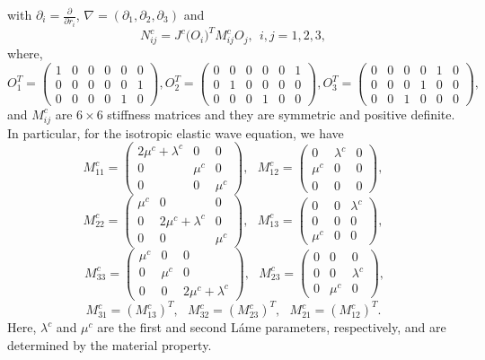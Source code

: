with $\partial_i = \frac{\partial}{\partial r_i}$, $\nabla = (\partial_1,\partial_2,\partial_3)$ and
\begin{equation}\label{N_definition}
	N_{ij}^c = J^c\big(O_i\big)^TM_{ij}^cO_j, \ \ i,j = 1,2,3,
\end{equation}
where, 
\[ O_{1}^T = \left(\begin{array}{cccccc}
1 & 0 & 0 &0 & 0 & 0\\
0 & 0 & 0 &0 & 0 & 1\\
0 & 0 & 0 &0 & 1 & 0\end{array}\right),  O_{2}^T = \left(\begin{array}{cccccc}
0 & 0 & 0 &0 & 0 & 1\\
0 & 1 & 0 &0 & 0 & 0\\
0 & 0 & 0 &1 & 0 & 0\end{array}\right),  O_{3}^T = \left(\begin{array}{cccccc}
0 & 0 & 0 &0 & 1 & 0\\
0 & 0 & 0 &1 & 0 & 0\\
0 & 0 & 1 &0 & 0 & 0\end{array}\right),\]
and $M_{ij}^c$ are $6\times 6$ stiffness matrices and they are symmetric and positive definite. In particular, for the isotropic elastic wave equation, we have
\[ M_{11}^c = \left(\begin{array}{ccc}
2\mu^c+\lambda^c & 0 & 0\\
0 & \mu^c & 0\\
0 & 0 & \mu^c\end{array}\right),\ \ \  M_{12}^c = \left(\begin{array}{ccc}
0 & \lambda^c & 0\\
\mu^c & 0 & 0\\
0 & 0 & 0\end{array}\right), \]
\begin{equation}\label{M_definition}
M_{22}^c = \left(\begin{array}{ccc}
\mu^c & 0 & 0\\
0 & 2\mu^c+\lambda^c & 0\\
0 & 0 & \mu^c\end{array}\right),\ \ \ M_{13}^c = \left(\begin{array}{ccc}
0 & 0 & \lambda^c\\
0 & 0 & 0\\
\mu^c & 0 & 0\end{array}\right),
\end{equation}
\[\ M_{33}^c = \left(\begin{array}{ccc}
\mu^c & 0 & 0\\
0 & \mu^c & 0\\
0 & 0 & 2\mu^c+\lambda^c\end{array}\right),\ \ \ M_{23}^c = \left(\begin{array}{ccc}
0 & 0 & 0\\
0 & 0 & \lambda^c\\
0 & \mu^c & 0\end{array}\right),\]
\[ M_{31}^c = (M_{13}^c)^T, \ \ \  M_{32}^c =(M_{23}^c)^T, \ \ \ M_{21}^c =(M_{12}^c)^T.\]
Here, $\lambda^c$ and $\mu^c$ are the first and second L{\' {a}}me parameters, respectively, and are determined by the material property. 

